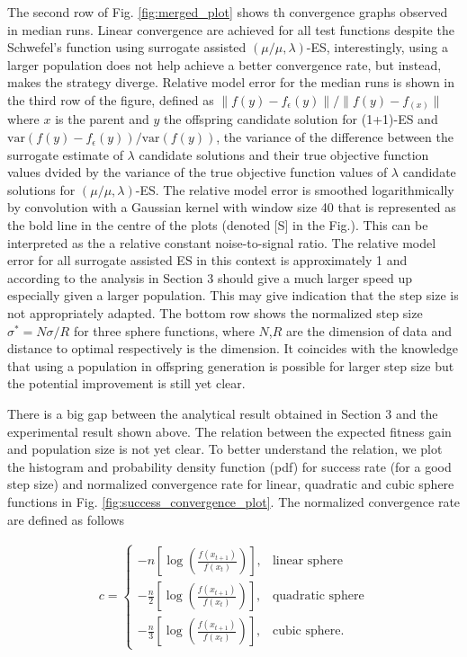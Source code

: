 The second row of Fig. \ref{fig:merged_plot} shows th convergence graphs observed in median runs. Linear convergence are achieved for all test functions despite the Schwefel's function using surrogate assisted $(\mu/\mu,\lambda)$-ES, interestingly, using a larger population does not help achieve a better convergence rate, but instead,  makes the strategy diverge. Relative model error for the median runs is shown in the third row of the figure, defined as $\|f(y)-f_{\epsilon}(y) \|/\|f(y)-f_(x) \|$ where $x$ is the parent and $y$ the offspring candidate solution for (1+1)-ES and $\text{var}(f(y)-f_\epsilon(y))/\text{var}(f(y))$, the variance of the difference between the surrogate estimate of $\lambda$ candidate solutions and their true objective function values dvided by the variance of the true objective function values of $\lambda$ candidate solutions for $(\mu/\mu,\lambda)$-ES. The relative model error is smoothed logarithmically by convolution with a Gaussian kernel with window size 40 that is represented as the bold line in the centre of the plots (denoted [S] in the Fig.). This can be interpreted as the a relative constant noise-to-signal ratio. The relative model error for all surrogate assisted ES in this context is approximately 1 and according to the analysis in Section 3 should give a much larger speed up especially given a larger population. This may give indication that the step size is not appropriately adapted. The bottom row shows the normalized step size $\sigma^* = N \sigma/R$ for three sphere functions, where $N$,$R$ are the dimension of data and distance to optimal respectively is the dimension. It coincides with the knowledge that using a population in offspring generation is possible for larger step size but the potential improvement is still yet clear. 

There is a big gap between the analytical result obtained in Section 3 and the experimental result shown above. The relation between the expected fitness gain and population size is not yet clear. To better understand the relation, we plot the histogram and probability density function (pdf) for success rate (for a good step size) and normalized convergence rate for linear, quadratic and cubic sphere functions in Fig. \ref{fig:success_convergence_plot}. The normalized convergence rate are defined as follows 

\begin{align}
c = 
\begin{cases}
- n \left[ \log \left( \frac{f(x_{t+1})}{f(x_t)} \right)\right],& \text{linear sphere} \\
 - \frac{n}{2} \left[ \log \left( \frac{f(x_{t+1})}{f(x_t)} \right)\right],& \text{quadratic sphere} \\
- \frac{n}{3} \left[ \log \left( \frac{f(x_{t+1})}{f(x_t)} \right)\right],& \text{cubic sphere}.
\end{cases}
\end{align}

